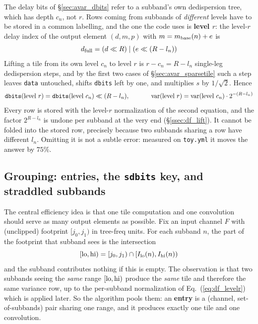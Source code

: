 \documentclass{article}
\numberwithin{equation}{section}   %
\begin{document}
The delay bits of \S\ref{sec:avar_dbits} refer to a subband's own dedispersion tree, which has
depth $c_n$, not $r$. Rows coming from subbands of {\em different} levels have to be stored in a
common labelling, and the one the code uses is {\bf level $r$}: the level-$r$ delay index of the
output element $(d, m, p)$ with $m = m_{\rm base}(n) + e$ is
\begin{equation}
d_{\rm full} = (d \ll R) \; | \; (e \ll (R - l_n))
  \label{eq:df_dfull}
\end{equation}
Lifting a tile from its own level $c_n$ to level $r$ is $r - c_n = R - l_n$ single-leg
dedispersion steps, and by the first two cases of \S\ref{sec:avar_sparsetile} such a step leaves
{\tt data} untouched, shifts {\tt dbits} left by one, and multiplies $s$ by $1/\sqrt2$. Hence
\begin{equation}
{\tt dbits}(\mbox{level } r) = {\tt dbits}(\mbox{level } c_n) \ll (R - l_n),
  \hspace{1.2cm}
{\rm var}(\mbox{level } r) = {\rm var}(\mbox{level } c_n) \cdot 2^{-(R - l_n)}
  \label{eq:df_levelr}
\end{equation}
Every row is stored with the level-$r$ normalization of the second equation, and the factor
$2^{R-l_n}$ is undone per subband at the very end (\S\ref{ssec:df_lift}). It cannot be folded
into the stored row, precisely because two subbands sharing a row have different $l_n$. Omitting
it is not a subtle error: measured on {\tt toy.yml} it moves the answer by $75\%$.

\subsection{Grouping: entries, the {\tt sdbits} key, and straddled subbands}
\label{ssec:df_groups}

The central efficiency idea is that one tile computation and one convolution should serve as many
output elements as possible. Fix an input channel $F$ with (unclipped) footprint $[j_0, j_1)$ in
tree-freq units. For each subband $n$, the part of the footprint that subband sees is the
intersection
\begin{equation}
[{\rm lo}, {\rm hi}) = [j_0, j_1) \cap [I_{\rm lo}(n), I_{\rm hi}(n))
\end{equation}
and the subband contributes nothing if this is empty. The observation is that two subbands seeing
the {\em same} range $[{\rm lo}, {\rm hi})$ produce the {\em same} tile and therefore the same
variance row, up to the per-subband normalization of Eq.\ (\ref{eq:df_levelr}) which is applied
later. So the algorithm pools them: an {\bf entry} is a (channel, set-of-subbands) pair sharing
one range, and it produces exactly one tile and one convolution.
\end{document}

